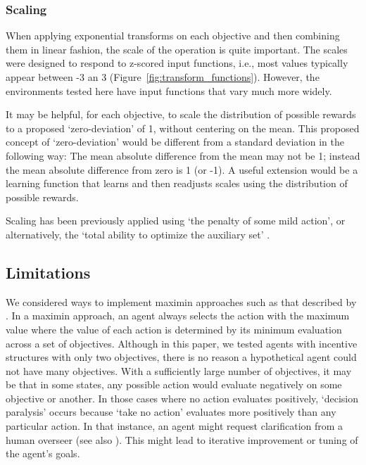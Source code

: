 \subsubsection{Scaling}

When applying exponential transforms  on each objective and then combining them in linear fashion, the scale of the operation is quite important. The scales were designed to respond to z-scored input functions, i.e., most values typically appear between -3 an 3 (Figure~\ref{fig:transform_functions}). However, the environments tested here have input functions that vary much more widely.

It may be helpful, for each objective, to scale the distribution of possible rewards to a proposed `zero-deviation' of 1, without centering on the mean. This proposed concept of `zero-deviation' would be different from a standard deviation in the following way: The mean absolute difference from the mean may not be 1; instead the mean absolute difference from zero is 1 (or -1). A useful extension would be a learning function that learns and then readjusts scales using the distribution of possible rewards.

Scaling has been previously applied using `the penalty of some mild action', or alternatively, the `total ability to optimize the auxiliary set' %
\cite{turner_conservative_2020}.




\subsection{Limitations}

We considered ways to implement maximin approaches such as that described by \cite{vamplew_human-aligned_2018}. In a maximin approach, an agent always selects the action with the maximum value where the value of each action is determined by its minimum evaluation across a set of objectives. Although in this paper, we tested agents with incentive structures with only two objectives, there is no reason a hypothetical agent could not have many objectives. With a sufficiently large number of objectives, it may be that in some states, any possible action would evaluate negatively on some objective or another. In those cases where no action evaluates positively, `decision paralysis' occurs because `take no action' evaluates more positively than any particular action. %
 In that instance, an agent might request clarification from a human overseer (see also \cite{pmlr-v125-cohen20a}). This might lead to iterative improvement or tuning of the agent's goals.

